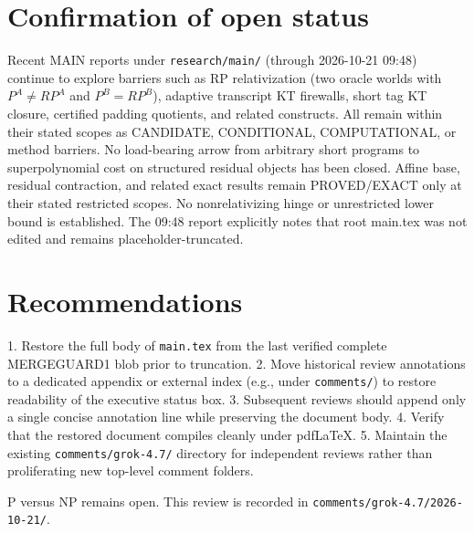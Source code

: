 \documentclass[11pt]{article}
\begin{document}
\section{Confirmation of open status}
Recent MAIN reports under \texttt{research/main/} (through 2026-10-21 09:48) continue to explore barriers such as RP relativization (two oracle worlds with \(P^A \neq RP^A\) and \(P^B = RP^B\)), adaptive transcript KT firewalls, short tag KT closure, certified padding quotients, and related constructs. All remain within their stated scopes as CANDIDATE, CONDITIONAL, COMPUTATIONAL, or method barriers. No load-bearing arrow from arbitrary short programs to superpolynomial cost on structured residual objects has been closed. Affine base, residual contraction, and related exact results remain PROVED/EXACT only at their stated restricted scopes. No nonrelativizing hinge or unrestricted lower bound is established. The 09:48 report explicitly notes that root main.tex was not edited and remains placeholder-truncated.

\section{Recommendations}
1. Restore the full body of \texttt{main.tex} from the last verified complete MERGEGUARD1 blob prior to truncation.
2. Move historical review annotations to a dedicated appendix or external index (e.g., under \texttt{comments/}) to restore readability of the executive status box.
3. Subsequent reviews should append only a single concise annotation line while preserving the document body.
4. Verify that the restored document compiles cleanly under pdfLaTeX.
5. Maintain the existing \texttt{comments/grok-4.7/} directory for independent reviews rather than proliferating new top-level comment folders.

P versus NP remains open. This review is recorded in \texttt{comments/grok-4.7/2026-10-21/}.

\end{document}
